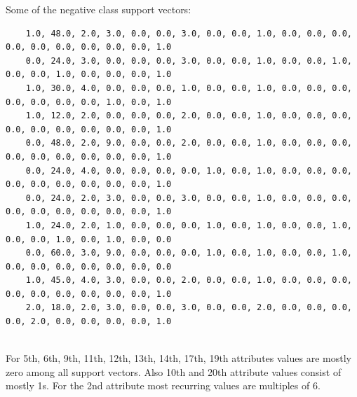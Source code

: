 \documentclass[12pt,a4paper, margin=1in]{article}
\begin{document}
Some of the negative class support vectors:
\begin{footnotesize}
    \begin{verbatim}
    1.0, 48.0, 2.0, 3.0, 0.0, 0.0, 3.0, 0.0, 0.0, 1.0, 0.0, 0.0, 0.0, 0.0, 0.0, 0.0, 0.0, 0.0, 0.0, 1.0
    0.0, 24.0, 3.0, 0.0, 0.0, 0.0, 3.0, 0.0, 0.0, 1.0, 0.0, 0.0, 1.0, 0.0, 0.0, 1.0, 0.0, 0.0, 0.0, 1.0
    1.0, 30.0, 4.0, 0.0, 0.0, 0.0, 1.0, 0.0, 0.0, 1.0, 0.0, 0.0, 0.0, 0.0, 0.0, 0.0, 0.0, 1.0, 0.0, 1.0
    1.0, 12.0, 2.0, 0.0, 0.0, 0.0, 2.0, 0.0, 0.0, 1.0, 0.0, 0.0, 0.0, 0.0, 0.0, 0.0, 0.0, 0.0, 0.0, 1.0
    0.0, 48.0, 2.0, 9.0, 0.0, 0.0, 2.0, 0.0, 0.0, 1.0, 0.0, 0.0, 0.0, 0.0, 0.0, 0.0, 0.0, 0.0, 0.0, 1.0
    0.0, 24.0, 4.0, 0.0, 0.0, 0.0, 0.0, 1.0, 0.0, 1.0, 0.0, 0.0, 0.0, 0.0, 0.0, 0.0, 0.0, 0.0, 0.0, 1.0
    0.0, 24.0, 2.0, 3.0, 0.0, 0.0, 3.0, 0.0, 0.0, 1.0, 0.0, 0.0, 0.0, 0.0, 0.0, 0.0, 0.0, 0.0, 0.0, 1.0
    1.0, 24.0, 2.0, 1.0, 0.0, 0.0, 0.0, 1.0, 0.0, 1.0, 0.0, 0.0, 1.0, 0.0, 0.0, 1.0, 0.0, 1.0, 0.0, 0.0
    0.0, 60.0, 3.0, 9.0, 0.0, 0.0, 0.0, 1.0, 0.0, 1.0, 0.0, 0.0, 1.0, 0.0, 0.0, 0.0, 0.0, 0.0, 0.0, 0.0
    1.0, 45.0, 4.0, 3.0, 0.0, 0.0, 2.0, 0.0, 0.0, 1.0, 0.0, 0.0, 0.0, 0.0, 0.0, 0.0, 0.0, 0.0, 0.0, 1.0
    2.0, 18.0, 2.0, 3.0, 0.0, 0.0, 3.0, 0.0, 0.0, 2.0, 0.0, 0.0, 0.0, 0.0, 2.0, 0.0, 0.0, 0.0, 0.0, 1.0
        
    \end{verbatim}
\end{footnotesize}

For 5th, 6th, 9th, 11th, 12th, 13th, 14th, 17th, 19th attributes values are mostly zero among all support vectors.
Also 10th and 20th attribute values consist of mostly 1s. For the 2nd attribute most recurring values are multiples of 6.
\end{document}
